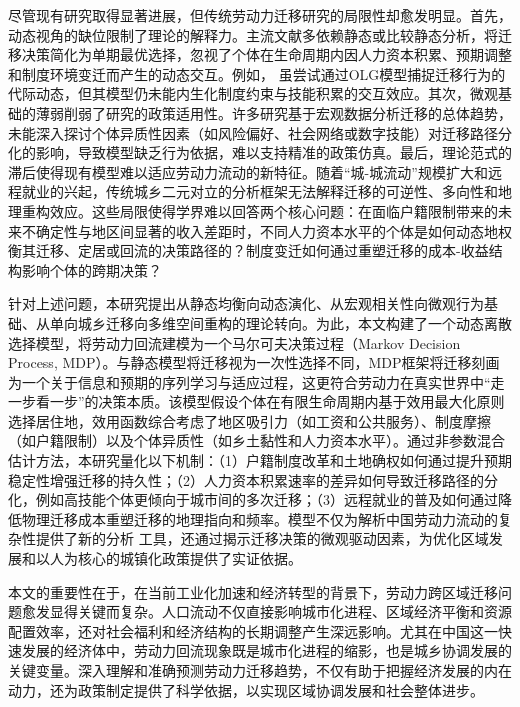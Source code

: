 \documentclass[
  a4paper,
  zihao=-4,
  fontset=mac,
  AutoFakeBold,
  AutoFakeSlant,
  oneside]{ctexbook}
\begin{document}
尽管现有研究取得显著进展，但传统劳动力迁移研究的局限性却愈发明显。首先，动态视角的缺位限制了理论的解释力。主流文献多依赖静态或比较静态分析，将迁移决策简化为单期最优选择，忽视了个体在生命周期内因人力资本积累、预期调整和制度环境变迁而产生的动态交互。例如，
\textcite{HanQiHengNongCunLaoDongLiQianYiMoCaYingXiangNongMinGongShuLiangYuGongZiJieGouMa2018}虽尝试通过OLG模型捕捉迁移行为的代际动态，但其模型仍未能内生化制度约束与技能积累的交互效应。其次，微观基础的薄弱削弱了研究的政策适用性。许多研究基于宏观数据分析迁移的总体趋势，未能深入探讨个体异质性因素（如风险偏好、社会网络或数字技能）对迁移路径分化的影响，导致模型缺乏行为依据，难以支持精准的政策仿真。最后，理论范式的滞后使得现有模型难以适应劳动力流动的新特征。随着“城-城流动”规模扩大和远程就业的兴起，传统城乡二元对立的分析框架无法解释迁移的可逆性、多向性和地理重构效应。这些局限使得学界难以回答两个核心问题：在面临户籍限制带来的未来不确定性与地区间显著的收入差距时，不同人力资本水平的个体是如何动态地权衡其迁移、定居或回流的决策路径的？制度变迁如何通过重塑迁移的成本-收益结构影响个体的跨期决策？

针对上述问题，本研究提出从静态均衡向动态演化、从宏观相关性向微观行为基础、从单向城乡迁移向多维空间重构的理论转向。为此，本文构建了一个动态离散选择模型，将劳动力回流建模为一个马尔可夫决策过程（Markov Decision Process, MDP）。与静态模型将迁移视为一次性选择不同，MDP框架将迁移刻画为一个关于信息和预期的序列学习与适应过程，这更符合劳动力在真实世界中“走一步看一步”的决策本质。该模型假设个体在有限生命周期内基于效用最大化原则选择居住地，效用函数综合考虑了地区吸引力（如工资和公共服务）、制度摩擦（如户籍限制）以及个体异质性（如乡土黏性和人力资本水平）。通过非参数混合估计方法，本研究量化以下机制：（1）户籍制度改革和土地确权如何通过提升预期稳定性增强迁移的持久性；（2）人力资本积累速率的差异如何导致迁移路径的分化，例如高技能个体更倾向于城市间的多次迁移；（3）远程就业的普及如何通过降低物理迁移成本重塑迁移的地理指向和频率。模型不仅为解析中国劳动力流动的复杂性提供了新的分析 工具，还通过揭示迁移决策的微观驱动因素，为优化区域发展和以人为核心的城镇化政策提供了实证依据。

本文的重要性在于，在当前工业化加速和经济转型的背景下，劳动力跨区域迁移问题愈发显得关键而复杂。人口流动不仅直接影响城市化进程、区域经济平衡和资源配置效率，还对社会福利和经济结构的长期调整产生深远影响。尤其在中国这一快速发展的经济体中，劳动力回流现象既是城市化进程的缩影，也是城乡协调发展的关键变量。深入理解和准确预测劳动力迁移趋势，不仅有助于把握经济发展的内在动力，还为政策制定提供了科学依据，以实现区域协调发展和社会整体进步。
\end{document}
